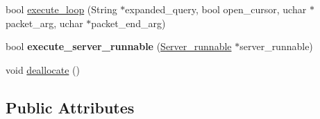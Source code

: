 \begin{DoxyCompactItemize}
\item 
bool \mbox{\hyperlink{classPrepared__statement_a242307a08c73c7f6ea9778d8f9af719b}{execute\+\_\+loop}} (String $\ast$expanded\+\_\+query, bool open\+\_\+cursor, uchar $\ast$packet\+\_\+arg, uchar $\ast$packet\+\_\+end\+\_\+arg)
\item 
\mbox{\label{classPrepared__statement_a1e7f864303a5ca289493105d2fd866ec}} 
bool {\bfseries execute\+\_\+server\+\_\+runnable} (\mbox{\hyperlink{classServer__runnable}{Server\+\_\+runnable}} $\ast$server\+\_\+runnable)
\item 
void \mbox{\hyperlink{classPrepared__statement_a3f94255f9c510ed6339d5ca8609f9003}{deallocate}} ()
\end{DoxyCompactItemize}
\subsection*{Public Attributes}
